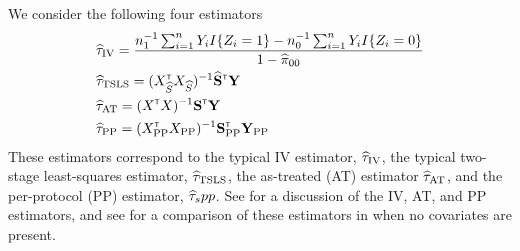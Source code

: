 \documentclass{article}
\def\siv{_{\text{IV}}}
\def\spp{_{\text{PP}}}
\def\sat{_{\text{AT}}}
\def\stsls{_{\text{TSLS}}}
\def\xpp{X\spp}
\begin{document}
We consider the following four estimators
\begin{align}
    &\tauhat\siv = \frac{n_1\inv\sum_{i=1}^nY_iI\{Z_i = 1\} - n_0\inv\sum_{i=1}^nY_iI\{Z_i = 0\}}{1 - \pihat_{00}} \label{iv_est} \\
    &\tauhat\stsls = (X_\Shat\trans X_\Shat)\inv \bShat\trans \bY  \label{tsls_est}\\
    &\tauhat\sat = (X\trans X)\inv \bS\trans \bY \label{at_est}\\
    &\tauhat\spp = (\xpp\trans\xpp)\inv \bS\spp\trans \bY\spp\label{pp_est}
\end{align}
These estimators correspond to the typical IV estimator, $\tauhat\siv$, the typical two-stage least-squares estimator, $\tauhat\stsls$, the as-treated (AT) estimator $\tauhat\sat$, and the per-protocol (PP) estimator, ${\widehat\tau}_spp$. See \cite{Little2018} for a discussion of the IV, AT, and PP estimators, and see \cite{antonelli2017synthetic} for a comparison of these estimators in when no covariates are present. 



\end{document}
